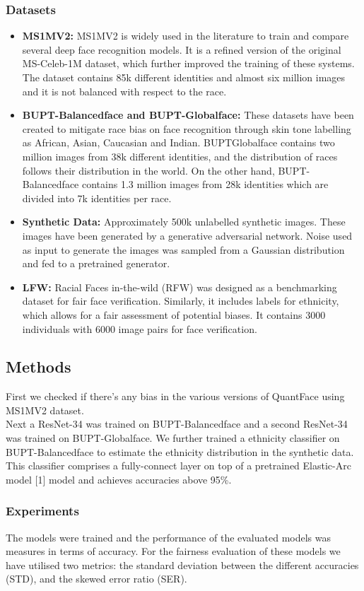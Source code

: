 \documentclass[12pt]{article}
\begin{document}
\subsubsection*{Datasets}
\begin{itemize}
  \item \textbf{MS1MV2:} MS1MV2 is widely used in the literature to train and
  compare several deep face recognition models. It is
  a refined version of the original MS-Celeb-1M dataset,
  which further improved the training of these systems. The
  dataset contains 85k different identities and almost six million
  images and it is not balanced with respect to the race.
  \item \textbf{BUPT-Balancedface and BUPT-Globalface:} These datasets have been created
  to mitigate race bias on face recognition through skin tone
  labelling as African, Asian, Caucasian and Indian. BUPTGlobalface contains two million images from 38k different
  identities, and the distribution of races follows their distribution in the world. On the other hand, BUPT-Balancedface
  contains 1.3 million images from 28k identities which are
  divided into 7k identities per race.
  \item \textbf{Synthetic Data:} Approximately 500k
  unlabelled synthetic images. These images have been generated by a generative adversarial network. Noise used as input to generate the images was sampled
  from a Gaussian distribution and fed to a pretrained generator.
  \item \textbf{LFW:} Racial Faces in-the-wild (RFW) was designed as a
  benchmarking dataset for fair face verification. Similarly, it
  includes labels for ethnicity, which allows for a fair assessment
  of potential biases. It contains 3000 individuals with 6000
  image pairs for face verification.
\end{itemize}
\subsection{Methods}
First we checked if there's any bias in the various versions of QuantFace using MS1MV2 dataset.\\
Next a ResNet-34 was trained
on BUPT-Balancedface and a second ResNet-34 was trained
on BUPT-Globalface. We further trained a ethnicity classifier
on BUPT-Balancedface to estimate the ethnicity distribution
in the synthetic data. This classifier comprises a fully-connect
layer on top of a pretrained Elastic-Arc model [1] model and
achieves accuracies above 95\%.
\subsubsection{Experiments}
The models were trained and the performance of the evaluated models was measures in
terms of accuracy. For the fairness evaluation of these models
we have utilised two metrics: the standard deviation between
the different accuracies (STD), and the skewed error ratio
(SER).
\end{document}
